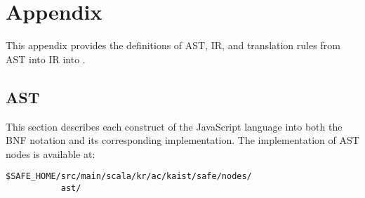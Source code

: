 \appendix

\chapter{Appendix}

This appendix provides the definitions of
AST, IR, and translation rules from AST into IR into \safe.

\section{AST}
This section describes each construct of the JavaScript language
into both the BNF notation and its corresponding implementation.
The implementation of AST nodes is available at:
\begin{verbatim}
$SAFE_HOME/src/main/scala/kr/ac/kaist/safe/nodes/
           ast/
\end{verbatim}
\small
